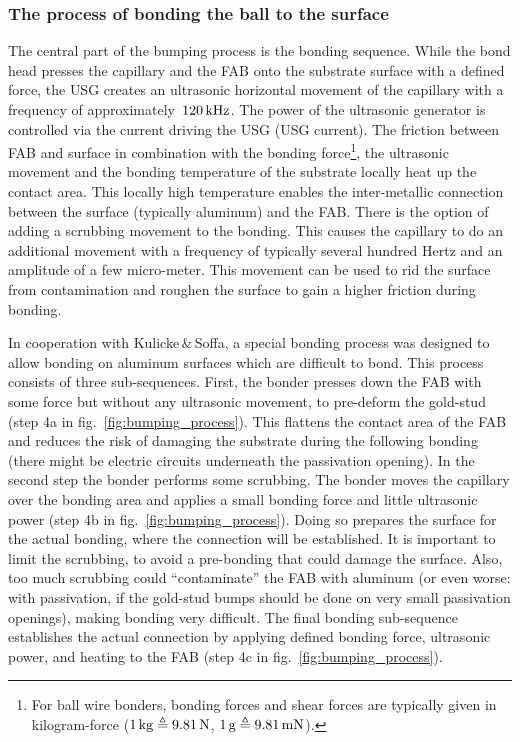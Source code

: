 \subsubsection{The process of bonding the ball to the surface}
The central part of the bumping process is the bonding sequence. While the bond head presses the capillary and the \ac{FAB} onto the substrate surface with a defined force, the \ac{USG} creates an ultrasonic horizontal movement of the capillary with a frequency of approximately~$120\,\rm{kHz}$. The power of the ultrasonic generator is controlled via the current driving the \ac{USG} (\ac{USG} current). The friction between \ac{FAB} and surface in combination with the bonding force\footnote{For ball wire bonders, bonding forces and shear forces are typically given in kilogram-force ($1\,\rm{kg}\triangleq 9.81\,\rm{N}$, $1\,\rm{g}\triangleq 9.81\,\rm{mN}$).}, the ultrasonic movement and the bonding temperature of the substrate locally heat up the contact area. This locally high temperature enables the inter-metallic connection between the surface (typically aluminum) and the \ac{FAB}. There is the option of adding a scrubbing movement to the bonding. This causes the capillary to do an additional movement with a frequency of typically several hundred Hertz and an amplitude of a few micro-meter. This movement can be used to rid the surface from contamination and roughen the surface to gain a higher friction during bonding.

In cooperation with Kulicke$\,\&\,$Soffa, a special bonding process was designed to allow bonding on aluminum surfaces which are difficult to bond. This process consists of three sub-sequences. First, the bonder presses down the \ac{FAB} with some force but without any ultrasonic movement, to pre-deform the gold-stud (step 4a in fig.~\ref{fig:bumping_process}). This flattens the contact area of the \ac{FAB} and reduces the risk of damaging the substrate during the following bonding (there might be electric circuits underneath the passivation opening). In the second step the bonder performs some scrubbing. The bonder moves the capillary over the bonding area and applies a small bonding force and little ultrasonic power (step 4b in fig.~\ref{fig:bumping_process}). Doing so prepares the surface for the actual bonding, where the connection will be established. It is important to limit the scrubbing, to avoid a pre-bonding that could damage the surface. Also, too much scrubbing could ``contaminate'' the \ac{FAB} with aluminum (or even worse: with passivation, if the gold-stud bumps should be done on very small passivation openings), making bonding very difficult. The final bonding sub-sequence establishes the actual connection by applying defined bonding force, ultrasonic power, and heating to the \ac{FAB} (step 4c in fig.~\ref{fig:bumping_process}).

